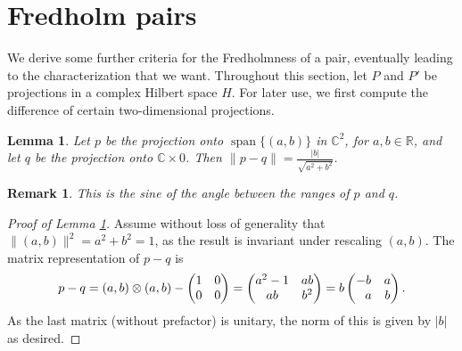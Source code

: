 \documentclass[pdftex]{sigma}
\numberwithin{equation}{section}
\newtheorem{Lemma}[Theorem]{Lemma}
\newtheorem{Remark}[Theorem]{Remark} }
\DeclareMathOperator{\spann}{span}
\begin{document}
	\section{Fredholm pairs}
	\label{s3}
	We derive some further criteria for the Fredholmness of a pair, eventually leading to the characterization that we want. Throughout this section, let $P$ and $P'$ be projections in a complex Hilbert space $H$. For later use, we first compute the difference of certain two-dimensional projections.
	\begin{Lemma}
		\label{2dE}
		Let $p$ be the projection onto $\spann\{(a,b)\}$ in $\mathbb{C}^2$, for $a,b\in \mathbb{R}$, and let $q$ be the projection onto $\mathbb{C}\times0$. Then $\|p-q\|=\frac{|b|}{\sqrt{a^2+b^2}}$.
	\end{Lemma}
	\begin{Remark}
		This is the sine of the angle between the ranges of $p$ and $q$.
	\end{Remark}
	\begin{proof}[Proof of Lemma \ref{2dE}]
		Assume without loss of generality that $\|(a,b)\|^2=a^2+b^2=1$, as the result is invariant under rescaling $(a,b)$.
		The matrix representation of $p-q$ is
		\[
        p-q=(a,b)\otimes(a,b)-\begin{pmatrix}{1}&{0}\\{0}&{0}\end{pmatrix}
        =\begin{pmatrix}{a^2-1}&{ab}\\{ab}&{b^2}\end{pmatrix}
        =b\begin{pmatrix}{-b}&{a}\\{\hphantom{-} a}&{b}\end{pmatrix}.
        \]
		As the last matrix (without prefactor) is unitary, the norm of this is given by $|b|$ as desired.
	\end{proof}
\end{document}
